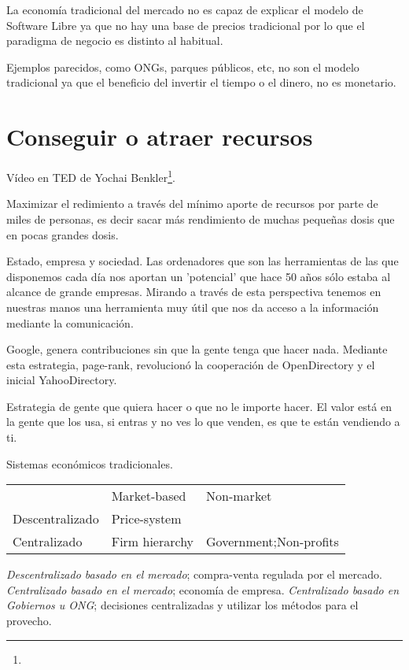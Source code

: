 \documentclass[11pt]{scrartcl}
\begin{document}
La economía tradicional del mercado no es capaz de explicar el modelo de Software Libre ya que no hay una base de precios tradicional por lo que el paradigma de negocio es distinto al habitual.

Ejemplos parecidos, como ONGs, parques públicos, etc, no son el modelo tradicional ya que el beneficio del invertir el tiempo o el dinero, no es monetario.

\section{Conseguir o atraer recursos}

Vídeo en TED de Yochai Benkler\footnote{}.

Maximizar el redimiento a través del mínimo aporte de recursos por parte de miles de personas, es decir sacar más rendimiento de muchas pequeñas dosis que en pocas grandes dosis.

Estado, empresa y sociedad. Las ordenadores que son las herramientas de las que disponemos cada día nos aportan un 'potencial' que hace 50 años sólo estaba al alcance de grande empresas. Mirando a través de esta perspectiva tenemos en nuestras manos una herramienta muy útil que nos da acceso a la información mediante la comunicación.

Google, genera contribuciones sin que la gente tenga que hacer nada. Mediante esta estrategia, page-rank, revolucionó la cooperación de OpenDirectory y el inicial YahooDirectory.

Estrategia de gente que quiera hacer o que no le importe hacer. El valor está en la gente que los usa, si entras y no ves lo que venden, es que te están vendiendo a ti.

Sistemas económicos tradicionales.\\

\begin{tabular}{ l l l}
                & Market-based    &   Non-market    \\
Descentralizado & Price-system    &                 \\
Centralizado    & Firm hierarchy  &  Government;Non-profits \\
 \end{tabular}

\emph{Descentralizado basado en el mercado}; compra-venta regulada por el mercado.
\emph{Centralizado basado en el mercado}; economía de empresa.
\emph{Centralizado basado en Gobiernos u ONG}; decisiones centralizadas y utilizar los métodos para el provecho.
\end{document}
